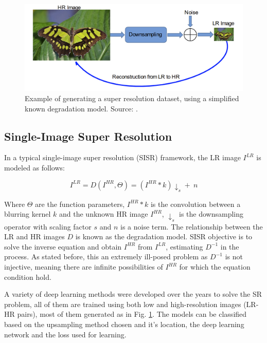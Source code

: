     \begin{figure}[H]
        \centering
        \includegraphics[width=\textwidth]{Includes/3-super-resolution-data.png}
        \caption{Example of generating a super resolution dataset, using a simplified known degradation model. Source: \cite{bashir2021comprehensive}.}
        \label{fig:3-super-resolution-data}
    \end{figure}

    

    \subsection{Single-Image Super Resolution}

        In a typical single-image super resolution (SISR) framework, the LR image $I^{LR}$ is modeled as follows:
    
        \begin{equation}
            I^{LR} = D(I^{HR},\Theta) = ( I^{HR} \ast k) \downarrow_s + \ n
            \label{eq:2-degradation-equation}
        \end{equation}
    
        Where $\Theta$ are the function parameters, $I^{HR} \ast k$ is the convolution between a blurring kernel $k$ and the unknown  HR image  $I^{HR}$, $\downarrow_s$ is the downsampling operator with scaling factor $s$ and $n$ is a noise term.
        The relationship between the LR and HR images $D$ is known as the degradation model.
        SISR objective is to solve the inverse equation and obtain $I^{HR}$ from $I^{LR}$, estimating $D^{-1}$ in the process. As stated before, this an extremely ill-posed problem as $D^{-1}$ is not injective, meaning there are infinite possibilities of $I^{HR}$ for which the equation condition hold. 

        A variety of deep learning methods were developed over the years to solve the SR problem, all of them are trained using both low and high-resolution images (LR-HR pairs), most of them generated as in Fig. \ref{fig:3-super-resolution-data}. The models can be classified based on the upsampling method chosen and it's location, the deep learning network and the loss used for learning.


